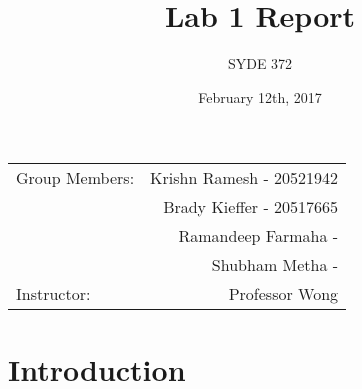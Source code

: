 \documentclass{article}
\title{Lab 1 Report} %
\author{SYDE 372} %
\date{February 12th, 2017} %
\begin{document}
\maketitle

\begin{center}
\begin{tabular}{l r}
Group Members: & Krishn Ramesh - 20521942 \\ %
& Brady Kieffer - 20517665 \\
& Ramandeep Farmaha - \\
& Shubham Metha - \\
Instructor: & Professor Wong %
\end{tabular}
\end{center}



\section{Introduction}
\end{document}
